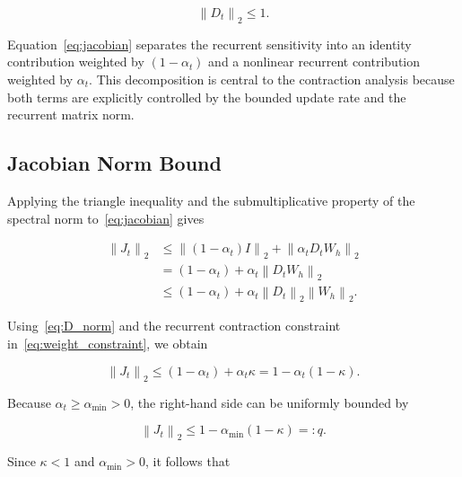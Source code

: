 \documentclass[journal]{IEEEtran}
\begin{document}
\begin{equation}
	\left\lVert D_t\right\rVert_2
	\leq1.
	\label{eq:D_norm}
\end{equation}

Equation~\eqref{eq:jacobian} separates the recurrent sensitivity into an identity contribution weighted by $(1-\alpha_t)$ and a nonlinear recurrent contribution weighted by $\alpha_t$. This decomposition is central to the contraction analysis because both terms are explicitly controlled by the bounded update rate and the recurrent matrix norm.


\subsection{Jacobian Norm Bound}
\label{subsec:jacobian_bound}

Applying the triangle inequality and the submultiplicative property of the spectral norm to~\eqref{eq:jacobian} gives

\begin{align}
	\left\lVert J_t\right\rVert_2
	&\leq
	\left\lVert(1-\alpha_t)I\right\rVert_2
	+
	\left\lVert\alpha_tD_tW_h\right\rVert_2
	\nonumber\\
	&=
	(1-\alpha_t)
	+
	\alpha_t
	\left\lVert D_tW_h\right\rVert_2
	\nonumber\\
	&\leq
	(1-\alpha_t)
	+
	\alpha_t
	\left\lVert D_t\right\rVert_2
	\left\lVert W_h\right\rVert_2.
	\label{eq:jacobian_bound_step1}
\end{align}

Using~\eqref{eq:D_norm} and the recurrent contraction constraint in~\eqref{eq:weight_constraint}, we obtain

\begin{equation}
	\left\lVert J_t\right\rVert_2
	\leq
	(1-\alpha_t)+\alpha_t\kappa
	=
	1-\alpha_t(1-\kappa).
	\label{eq:jacobian_bound_step2}
\end{equation}

Because $\alpha_t\geq\alpha_{\min}>0$, the right-hand side can be uniformly bounded by

\begin{equation}
	\left\lVert J_t\right\rVert_2
	\leq
	1-\alpha_{\min}(1-\kappa)
	=:q.
	\label{eq:uniform_q}
\end{equation}

Since $\kappa<1$ and $\alpha_{\min}>0$, it follows that
\end{document}
